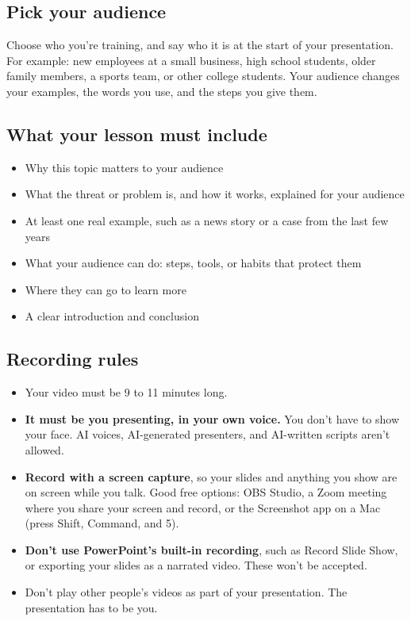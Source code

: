 \documentclass[12pt]{article}
\begin{document}
\subsection*{Pick your audience}
Choose who you're training, and say who it is at the start of your presentation. For example: new employees at a small business, high school students, older family members, a sports team, or other college students. Your audience changes your examples, the words you use, and the steps you give them.

\subsection*{What your lesson must include}
\begin{itemize}
    \item Why this topic matters to your audience
    \item What the threat or problem is, and how it works, explained for your audience
    \item At least one real example, such as a news story or a case from the last few years
    \item What your audience can do: steps, tools, or habits that protect them
    \item Where they can go to learn more
    \item A clear introduction and conclusion
\end{itemize}

\subsection*{Recording rules}
\begin{itemize}
    \item Your video must be 9 to 11 minutes long.
    \item \textbf{It must be you presenting, in your own voice.} You don't have to show your face. AI voices, AI-generated presenters, and AI-written scripts aren't allowed.
    \item \textbf{Record with a screen capture}, so your slides and anything you show are on screen while you talk. Good free options: OBS Studio, a Zoom meeting where you share your screen and record, or the Screenshot app on a Mac (press Shift, Command, and 5).
    \item \textbf{Don't use PowerPoint's built-in recording}, such as Record Slide Show, or exporting your slides as a narrated video. These won't be accepted.
    \item Don't play other people's videos as part of your presentation. The presentation has to be you.
\end{itemize}
\end{document}
